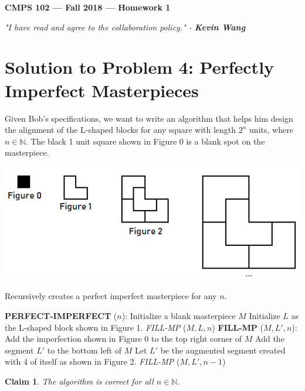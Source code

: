 \documentclass[11pt]{article}
\theoremstyle{definition}
\theoremstyle{plain}
\newtheorem{claim}{Claim}
\theoremstyle{indented-remark}
\theoremstyle{indented-proof}
\begin{document}
\begin{center}
{\bf\Large CMPS 102 --- Fall 2018 ---  Homework 1}
\end{center}

\begin{center}
\textit{"I have read and agree to the collaboration policy." - \textbf{Kevin Wang}}
\end{center}

\section*{Solution to Problem 4: Perfectly Imperfect Masterpieces}

Given Bob's specifications, we want to write an algorithm that helps him design the alignment of the L-shaped blocks for any square with length $2^n$ units, where $n \in \mathbb{N}$. The black 1 unit square shown in Figure 0 is a blank spot on the masterpiece.

\centerline{\includegraphics[scale=1]{images/fig3.png}}

\begin{algorithm}
\caption{Recursively creates a perfect imperfect masterpiece for any $n$.}
\begin{algorithmic} 
\STATE \textbf{PERFECT-IMPERFECT} ($n$):
\STATE Initialize a blank masterpiece $M$
\STATE Initialize $L$ as the L-shaped block shown in Figure 1.
\STATE \textit{FILL-MP} ($M, L, n$)
\STATE 
\STATE \textbf{FILL-MP} ($M, L', n$):
\STATE Add the imperfection shown in Figure 0 to the top right corner of $M$
\ELSE[$n > 0$]
\STATE Add the segment $L'$ to the bottom left of $M$
\STATE Let $L'$ be the augmented segment created with 4 of itself as shown in Figure 2.
\STATE \textit{FILL-MP} ($M, L', n - 1$)
\ENDIF
\end{algorithmic}
\end{algorithm}

\begin{claim}
The algorithm is correct for all $n \in \mathbb{N}$.
\end{claim}
\end{document}
